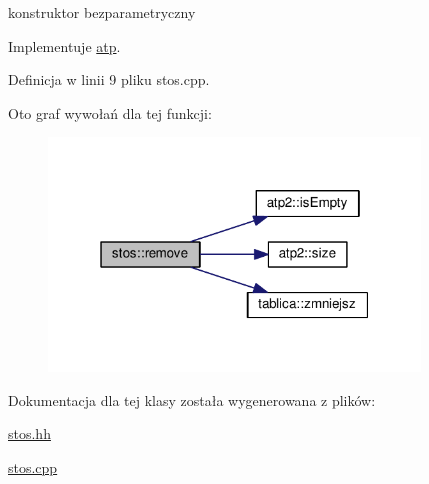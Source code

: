 konstruktor bezparametryczny 



Implementuje \hyperlink{classatp_a8294b0364a83890f88ef798b11473f7e}{atp}.



Definicja w linii 9 pliku stos.\+cpp.



Oto graf wywołań dla tej funkcji\+:\nopagebreak
\begin{figure}[H]
\begin{center}
\leavevmode
\includegraphics[width=280pt]{classstos_a8af2cbfa1b680a7f045d3390a46a1748_cgraph}
\end{center}
\end{figure}




Dokumentacja dla tej klasy została wygenerowana z plików\+:\begin{DoxyCompactItemize}
\item 
\hyperlink{stos_8hh}{stos.\+hh}\item 
\hyperlink{stos_8cpp}{stos.\+cpp}\end{DoxyCompactItemize}
